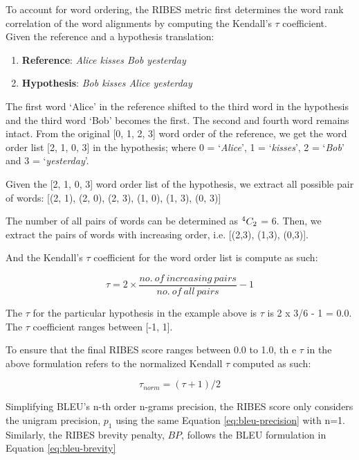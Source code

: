 To account for word ordering, the RIBES metric first determines the word rank correlation of the word alignments by computing the Kendall's $\tau$ coefficient. Given the reference and a hypothesis translation:

\begin{enumerate}
  \item[]{\textbf{Reference}:  \textit{Alice kisses Bob yesterday}}
  \item[]{\textbf{Hypothesis}: \textit{Bob kisses Alice yesterday}}
\end{enumerate}


The first word `Alice' in the reference shifted to the third word in the hypothesis and the third word `Bob' becomes the first. The second and fourth word remains intact. From the original [0, 1, 2, 3] word order of the reference, we get the word order list [2, 1, 0, 3] in the hypothesis; where 0 = `\textit{Alice}', 1 = `\textit{kisses}', 2 = `\textit{Bob}' and 3 = `\textit{yesterday}'. 

Given the [2, 1, 0, 3] word order list of the hypothesis, we extract all possible pair of words: [(2, 1), (2, 0), (2, 3), (1, 0), (1, 3), (0, 3)]

The number of all pairs of words can be determined as ${}^{4}C_{2}$ = 6. Then, we extract the pairs of words with increasing order, i.e. [(2,3), (1,3), (0,3)].

And the Kendall's $\tau$ coefficient for the word order list is compute as such:

\begin{equation}
\tau = 2 \times \frac{ no. \ of \ increasing \ pairs }{ no. \ of \ all \ pairs } -1
\end{equation}

The $\tau$ for the particular hypothesis in the example above is $\tau$ is 2 x 3/6 - 1 = 0.0. The $\tau$ coefficient ranges between [-1, 1].

To ensure that the final RIBES score ranges between 0.0 to 1.0, th e $\tau$ in the above formulation refers to the normalized Kendall $\tau$ computed as such:

\begin{equation}
\tau_{norm} = (\tau + 1)/2
\end{equation}

Simplifying BLEU's n-th order n-grams precision, the RIBES score only considers the unigram precision, $p_{1}$ using the same Equation \eqref{eq:bleu-precision} with n=1. Similarly, the RIBES brevity penalty, $BP$, follows the BLEU formulation in Equation \eqref{eq:bleu-brevity}


